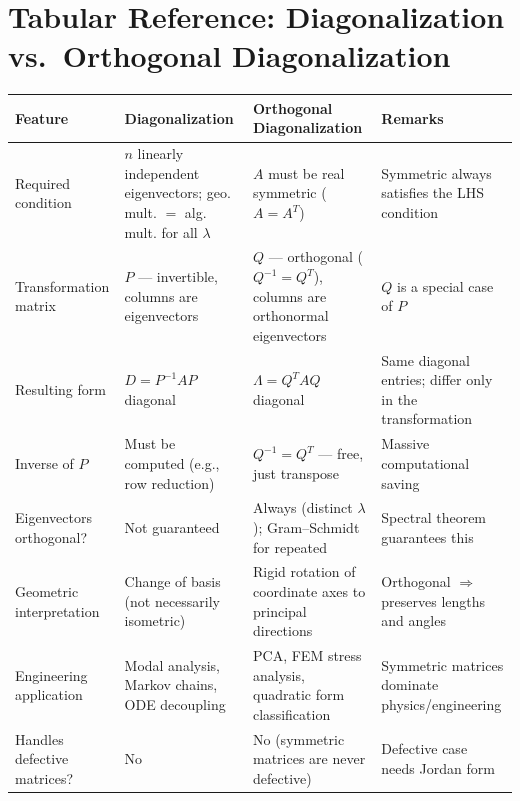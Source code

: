 \documentclass[12pt,a4paper]{article}
\begin{document}
\section{Tabular Reference: Diagonalization vs.\ Orthogonal Diagonalization}

\begin{center}
\begin{tabular}{@{}p{3.2cm}p{3.8cm}p{4.2cm}p{3.8cm}@{}}
\toprule
\textbf{Feature} & \textbf{Diagonalization} & \textbf{Orthogonal Diagonalization} & \textbf{Remarks} \\
\midrule
Required condition & $n$ linearly independent eigenvectors; geo. mult. $=$ alg. mult. for all $\lambda$ & $A$ must be real symmetric ($A=A^T$) & Symmetric always satisfies the LHS condition \\
\addlinespace
Transformation matrix & $P$ --- invertible, columns are eigenvectors & $Q$ --- orthogonal ($Q^{-1}=Q^T$), columns are orthonormal eigenvectors & $Q$ is a special case of $P$ \\
\addlinespace
Resulting form & $D = P^{-1}AP$ diagonal & $\Lambda = Q^TAQ$ diagonal & Same diagonal entries; differ only in the transformation \\
\addlinespace
Inverse of $P$ & Must be computed (e.g., row reduction) & $Q^{-1} = Q^T$ --- free, just transpose & Massive computational saving \\
\addlinespace
Eigenvectors orthogonal? & Not guaranteed & Always (distinct $\lambda$); Gram--Schmidt for repeated & Spectral theorem guarantees this \\
\addlinespace
Geometric interpretation & Change of basis (not necessarily isometric) & Rigid rotation of coordinate axes to principal directions & Orthogonal $\Rightarrow$ preserves lengths and angles \\
\addlinespace
Engineering application & Modal analysis, Markov chains, ODE decoupling & PCA, FEM stress analysis, quadratic form classification & Symmetric matrices dominate physics/engineering \\
\addlinespace
Handles defective matrices? & No & No (symmetric matrices are never defective) & Defective case needs Jordan form \\
\bottomrule
\end{tabular}
\end{center}

\end{document}
